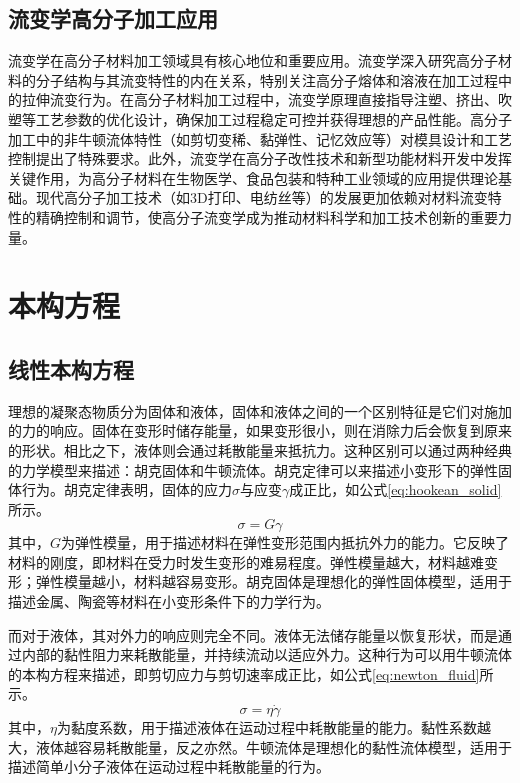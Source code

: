 \subsection{流变学高分子加工应用}
流变学在高分子材料加工领域具有核心地位和重要应用。流变学深入研究高分子材料的分子结构与其流变特性的内在关系，特别关注高分子熔体和溶液在加工过程中的拉伸流变行为\cite{lingComparisonReviewClassical2023}。在高分子材料加工过程中，流变学原理直接指导注塑、挤出、吹塑等工艺参数的优化设计\cite{banerjeeRoleRheologyMorphology2023}，确保加工过程稳定可控并获得理想的产品性能。高分子加工中的非牛顿流体特性（如剪切变稀、黏弹性、记忆效应等）对模具设计和工艺控制提出了特殊要求\cite{sunReviewConstitutiveModels2024,wang2023non,lowe2019rheology}。此外，流变学在高分子改性技术和新型功能材料开发中发挥关键作用\cite{zhangModificationTechnologiesConstitutive2024}，为高分子材料在生物医学\cite{martin2023rheology,jeon2023review}、食品包装\cite{schreuders2022non}和特种工业领域\cite{campbellNewtonianPowerLaw2018}的应用提供理论基础。现代高分子加工技术（如3D打印、电纺丝等）的发展更加依赖对材料流变特性的精确控制和调节\cite{kim2024role,murch2024non}，使高分子流变学成为推动材料科学和加工技术创新的重要力量。

\section{本构方程}
\subsection{线性本构方程}
理想的凝聚态物质分为固体和液体，固体和液体之间的一个区别特征是它们对施加的力的响应。固体在变形时储存能量，如果变形很小，则在消除力后会恢复到原来的形状。相比之下，液体则会通过耗散能量来抵抗力\cite{ricarteTutorialReviewLinear2024,yaoInelasticFluidModels2024}。这种区别可以通过两种经典的力学模型来描述：胡克固体和牛顿流体。胡克定律可以来描述小变形下的弹性固体行为。胡克定律表明，固体的应力$\sigma$与应变$\gamma$成正比，如公式\eqref{eq:hookean_solid}所示。
\begin{equation}
  \sigma = G \gamma  \label{eq:hookean_solid}
\end{equation}
其中，$G$为弹性模量，用于描述材料在弹性变形范围内抵抗外力的能力。它反映了材料的刚度，即材料在受力时发生变形的难易程度。弹性模量越大，材料越难变形；弹性模量越小，材料越容易变形。胡克固体是理想化的弹性固体模型，适用于描述金属、陶瓷等材料在小变形条件下的力学行为\cite{sunReviewConstitutiveModels2024}。

而对于液体，其对外力的响应则完全不同。液体无法储存能量以恢复形状，而是通过内部的黏性阻力来耗散能量，并持续流动以适应外力。这种行为可以用牛顿流体的本构方程来描述，即剪切应力与剪切速率成正比，如公式\eqref{eq:newton_fluid}所示。
\begin{equation}
  \sigma = \eta \dot{\gamma}  \label{eq:newton_fluid}
\end{equation}
其中，$\eta$为黏度系数，用于描述液体在运动过程中耗散能量的能力。黏性系数越大，液体越容易耗散能量，反之亦然。牛顿流体是理想化的黏性流体模型，适用于描述简单小分子液体在运动过程中耗散能量的行为\cite{ricarteTutorialReviewLinear2024}。

